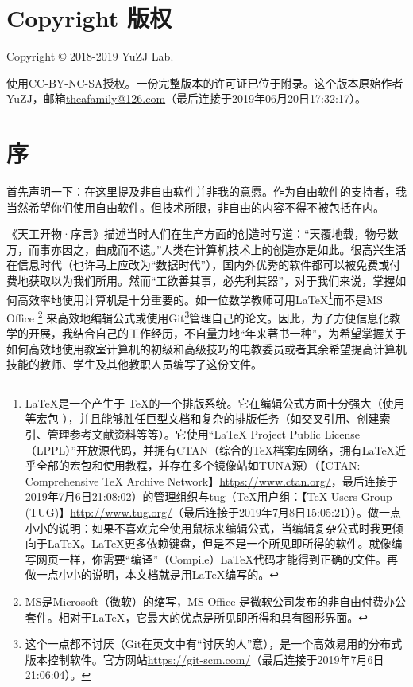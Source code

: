 \section{Copyright 版权}
Copyright \copyright{} 2018-2019 YuZJ Lab. \par
使用CC-BY-NC-SA授权。一份完整版本的许可证已位于附录。这个版本原始作者YuZJ，邮箱\url{theafamily@126.com}（最后连接于2019年06月20日17:32:17）。
\begin{center}\large \bf {\color{red}{对本文档所引起的任何后果不作担保！}}\normalall\end{center}
\section{序}
首先声明一下：在这里提及非自由软件并非我的意愿。作为自由软件的支持者，我当然希望你们使用自由软件。但技术所限，非自由的内容不得不被包括在内。\par
《天工开物·序言》描述当时人们在生产方面的创造时写道：“天覆地载，物号数万，而事亦因之，曲成而不遗。”人类在计算机技术上的创造亦是如此。很高兴生活在信息时代（也许马上应改为“数据时代”），国内外优秀的软件都可以被免费或付费地获取以为我们所用。然而“工欲善其事，必先利其器”，对于我们来说，掌握如何高效率地使用计算机是十分重要的。如一位数学教师可用\LaTeX\footnote{\LaTeX 是一个产生于 \TeX 的一个排版系统。它在编辑公式方面十分强大（使用 \AmSTeX 等宏包 ），并且能够胜任巨型文档和复杂的排版任务（如交叉引用、创建索引、管理参考文献资料等等）。它使用“LaTeX Project Public Li­cense （LPPL）”开放源代码，并拥有CTAN（综合的TeX档案库网络，拥有\LaTeX 近乎全部的宏包和使用教程，并存在多个镜像站如TUNA源）（【CTAN: Comprehensive TeX Archive Network】\url{https://www.ctan.org/}，最后连接于2019年7月6日21:08:02）的管理组织与tug（\TeX 用户组：【TeX Users Group (TUG)】\url{http://www.tug.org/}（最后连接于2019年7月8日15:05:21））。做一点小小的说明：如果不喜欢完全使用鼠标来编辑公式，当编辑复杂公式时我更倾向于\LaTeX。\LaTeX 更多依赖键盘，但是不是一个所见即所得的软件。就像编写网页一样，你需要“编译”（Compile）\LaTeX 代码才能得到正确的文件。再做一点小小的说明，本文档就是用\LaTeX 编写的。}而不是MS Office \footnote{MS是Microsoft（微软）的缩写，MS Office 是微软公司发布的非自由付费办公套件。相对于\LaTeX ，它最大的优点是所见即所得和具有图形界面。} 来高效地编辑公式或使用Git\footnote{这个一点都不讨厌（Git在英文中有“讨厌的人”意），是一个高效易用的分布式版本控制软件。官方网站\url{https://git-scm.com/}（最后连接于2019年7月6日21:06:04）。}管理自己的论文。因此，为了方便信息化教学的开展，我结合自己的工作经历，不自量力地“年来著书一种”，为希望掌握关于如何高效地使用教室计算机的初级和高级技巧的电教委员或者其余希望提高计算机技能的教师、学生及其他教职人员编写了这份文件。\par
